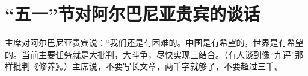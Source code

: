 \section[ “五一”节对阿尔巴尼亚贵宾的谈话（一九六七年五月一日）]{ “五一”节对阿尔巴尼亚贵宾的谈话}


主席对阿尔巴尼亚贵宾说：“我们还是有困难的。中国是有希望的，世界是有希望的。当前主要任务就是大批判，大斗争，尽快实现三结合。（有人谈到像“九评”那样批判《修养》。）主席说，不要写长文章，两千字就够了，不要超过三千。


